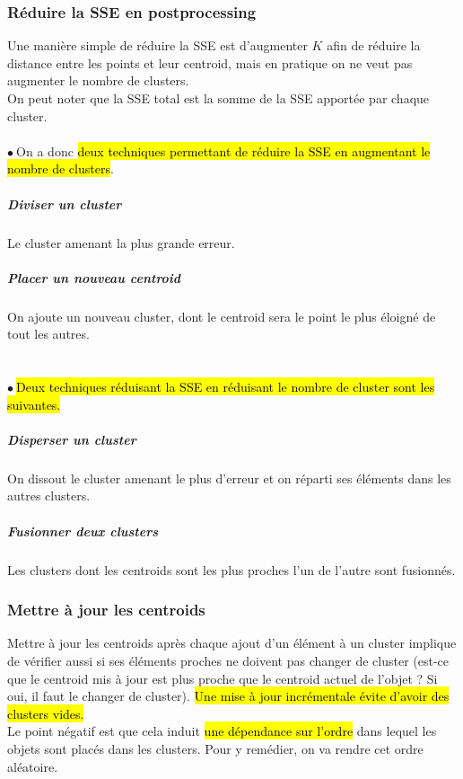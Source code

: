 \documentclass[letterpaper, 12pt]{article}
\newcommand{\alinea}{
\hspace*{0.5cm}}
\newcommand{\point}{$\bullet\ $}
\begin{document}
			\subsubsection{Réduire la SSE en postprocessing}
				\alinea Une manière simple de réduire la SSE est d'augmenter
					$K$ afin de réduire la distance entre les points et leur
					centroid, mais en pratique on ne veut pas augmenter le
					nombre de clusters.\\
				\alinea On peut noter que la SSE total est la somme de
					la SSE apportée par chaque cluster.\\
				~\\
				\point On a donc \hl{deux
					techniques permettant de réduire la SSE en augmentant
					le nombre de clusters}.
				\subparagraph{Diviser un cluster} Le cluster amenant la
					plus grande erreur.
				\newpage
				\subparagraph{Placer un nouveau centroid} On ajoute
					un nouveau cluster, dont le centroid sera le point le 
					plus éloigné de tout les autres.\\
				~\\~\\
				\point \hl{Deux techniques réduisant la SSE en réduisant le
					nombre de cluster sont les suivantes.}
				\subparagraph{Disperser un cluster} On dissout le cluster
					amenant le plus d'erreur et on réparti ses éléments dans
					les autres clusters.
				\subparagraph{Fusionner deux clusters} Les clusters
					dont les centroids sont les plus proches l'un de l'autre
					sont fusionnés.
			\subsubsection{Mettre à jour les centroids}
				\alinea Mettre à jour les centroids après chaque ajout
					d'un élément à un cluster implique de vérifier
					aussi si ses éléments proches ne doivent pas changer 
					de cluster (est-ce que le centroid mis à jour
					est plus proche que le centroid actuel de l'objet ? Si
					oui, il faut le changer de cluster).\hl{ Une mise à jour 
					incrémentale évite d'avoir des clusters vides.}\\
				\alinea Le point négatif est que cela induit \hl{une dépendance
					sur l'ordre} dans lequel les objets sont placés dans
					les clusters. Pour y remédier, on va rendre cet ordre 
					aléatoire.
\end{document}
